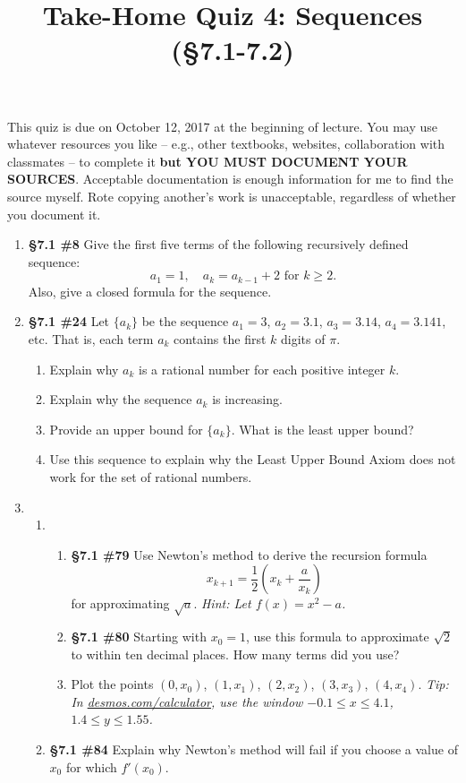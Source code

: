 \documentclass[%
]{article}
\title{\vspace{-3.5pc} 
	\flushleft \bf \Large Take-Home Quiz 4: Sequences %
	 (\S7.1-7.2)}
\date{}
\begin{document}
\maketitle

\vspace{-3pc}
 This quiz is due on October 12, 2017 at the beginning of lecture.  You may use whatever resources you like -- e.g., other textbooks, websites, collaboration with classmates -- to complete it \textbf{but YOU MUST DOCUMENT YOUR SOURCES}.  Acceptable documentation is enough information for me to find the source myself.  Rote copying another's work is unacceptable, regardless of whether you document it.  

\noindent\hrulefill

\begin{enumerate}
\item {\bf \S7.1 \#8} Give the first five terms of the following recursively defined sequence:
\[
a_1=1,\quad a_k=a_{k-1}+2\text{ for } k\geq 2.
\]
Also, give a closed formula for the sequence.
 
\item {\bf \S7.1 \#24} Let $\{a_k\}$ be the sequence $a_1=3$, $a_2=3.1$, $a_3=3.14$, $a_4=3.141$, etc.  That is, each term $a_k$ contains the first $k$ digits of $\pi$.
	\begin{enumerate}
	\item Explain why $a_k$ is a rational number for each positive integer $k$.
	\item Explain why the sequence $a_k$ is increasing.
	\item Provide an upper bound for $\{a_k\}$.  What is the least upper bound?
	\item Use this sequence to explain why the Least Upper Bound Axiom does not work for the set of rational numbers.
	\end{enumerate}

\item \begin{enumerate}
	\item \begin{enumerate}
		\item {\bf \S7.1 \#79} Use Newton's method to derive the recursion formula
		\[
		x_{k+1}=\frac{1}{2}\left(x_k+\frac{a}{x_k} \right)
		\]
		for approximating $\sqrt a$.  \textit{Hint: Let $f(x)=x^2-a$.}
		\item {\bf \S7.1 \#80} Starting with $x_0=1$, use this formula to approximate $\sqrt 2$ to within ten decimal places.  How many terms did you use?
		\item Plot the points $(0,x_0)$, $(1,x_1)$, $(2,x_2)$, $(3,x_3)$, $(4,x_4)$.  \textit{Tip: In \url{desmos.com/calculator}, use the window $-0.1\leq x\leq 4.1$, $1.4\leq y\leq 1.55$.}
		\end{enumerate}
	\item {\bf \S7.1 \#84} Explain why Newton's method will fail if you choose a value of $x_0$ for which $f'(x_0)$.	
	\end{enumerate}
	

\end{enumerate}
\end{document}

